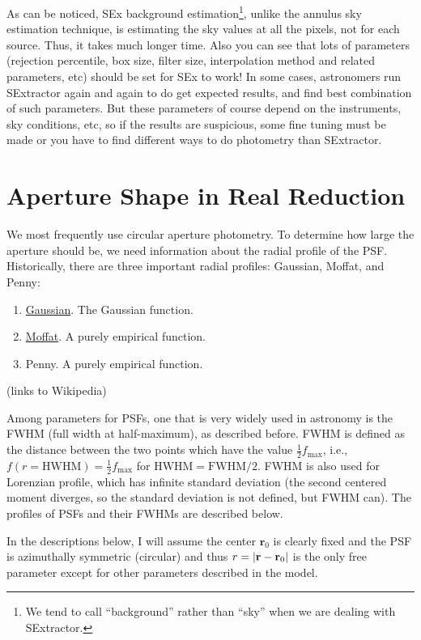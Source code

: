 As can be noticed, SEx background estimation\footnote{We tend to call ``background'' rather than ``sky'' when we are dealing with SExtractor.}, unlike the annulus sky estimation technique, is estimating the sky values at all the pixels, not for each source. Thus, it takes much longer time. Also you can see that lots of parameters (rejection percentile, box size, filter size, interpolation method and related parameters, etc) should be set for SEx to work! In some cases, astronomers run SExtractor again and again to do get expected results, and find best combination of such parameters. But these parameters of course depend on the instruments, sky conditions, etc, so if the results are suspicious, some fine tuning must be made or you have to find different ways to do photometry than SExtractor.


\section{Aperture Shape in Real Reduction}
We most frequently use circular aperture photometry. To determine how large the aperture should be, we need information about the radial profile of the PSF. Historically, there are three important radial profiles: Gaussian, Moffat, and Penny:
\begin{enumerate}
\item \href{https://en.wikipedia.org/wiki/Gaussian_function}{Gaussian}. The Gaussian function.
\item \href{https://en.wikipedia.org/wiki/Moffat_distribution}{Moffat}. A purely empirical function. 
\item Penny. A purely empirical function.
\end{enumerate}
(links to Wikipedia)

Among parameters for PSFs, one that is very widely used in astronomy is the FWHM (full width at half-maximum), as described before. FWHM is defined as the distance between the two points which have the value $\frac{1}{2} f_\mathrm{max}$, i.e., $ f(r = \mathrm{HWHM}) = \frac{1}{2} f_\mathrm{max} $ for $ \mathrm{HWHM} = \mathrm{FWHM}/2 $. FWHM is also used for Lorenzian profile, which has infinite standard deviation (the second centered moment diverges, so the standard deviation is not defined, but FWHM can). The profiles of PSFs and their FWHMs are described below.

In the descriptions below, I will assume the center $ \textbf{r}_0 $ is clearly fixed and the PSF is azimuthally symmetric (circular) and thus $ r = \abs{\textbf{r} - \textbf{r}_0} $ is the only free parameter except for other parameters described in the model.

